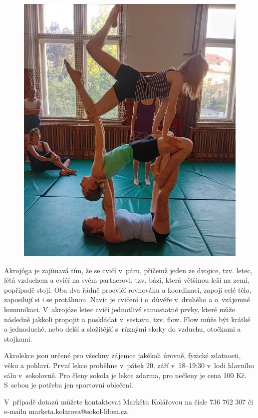 \documentclass[11pt]{article}
\begin{document}
\begin{figure}
  \includegraphics[width=0.9\linewidth]{./akrojoga-1.jpg}
\end{figure}

Akrojóga je zajímavá tím, že se cvičí v~páru, přičemž jeden ze dvojice, tzv. letec, létá vzduchem a cvičí na svém partnerovi, tzv. bázi, která většinou leží na zemi, popřípadě stojí. Oba dva řádně procvičí rovnováhu a koordinaci, zapojí celé tělo, zaposilují si i se protáhnou. Navíc je cvičení i o~důvěře v~druhého a o~vzájemné komunikaci. V~akrojóze letec cvičí jednotlivé samostatné prvky, které může následně jakkoli propojit a poskládat v~sestavu, tzv. flow. Flow může být krátké a jednoduché, nebo delší a složitější s~různými skoky do vzduchu, otočkami a stojkami.

Akrolekce jsou určené pro všechny zájemce jakékoli úrovně, fyzické zdatnosti, věku a pohlaví. První lekce proběhne v~pátek 20. září v~18–⁠⁠⁠⁠⁠⁠19:30 v~lodi hlavního sálu v~sokolovně. Pro členy sokola je lekce zdarma, pro nečleny je cena 100 Kč. S~sebou je potřeba jen sportovní oblečení.

V~případě dotazů můžete kontaktovat Markétu Kolářovou na čísle 736 762 307 či e-mailu marketa.kolarova@sokol-liben.cz.
\end{document}
